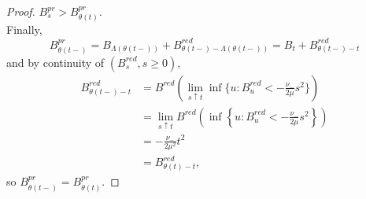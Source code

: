\begin{proof}
$B^{pr}_s>B^{pr}_{\theta(t)}$. \\
Finally, 
$$B^{pr}_{\theta(t-)}=B_{\Lambda(\theta(t-))}+B^{red}_{\theta(t-)-\Lambda(\theta(t-))}
=B_{t}+B^{red}_{\theta(t-)-t}$$
and by continuity of $(B^{red}_s,s\geq 0)$,
\begin{align*}B^{red}_{\theta(t-)-t}&=B^{red}\left({\lim_{s\uparrow t}\inf\{u:B^{red}_u<-\frac{\nu_-}{2\mu} s^2\}}\right)\\&=\lim_{s\uparrow t} B^{red}\left({\inf\left\{u:B^{red}_u<-\frac{\nu_-}{2\mu} s^2\right\}}\right)\\&= -\frac{\nu_-}{2\mu^2}t^2\\
&=B^{red}_{\theta(t)-t}, \end{align*}
so 
$B^{pr}_{\theta(t-)}=B^{pr}_{\theta(t)}.$
\end{proof}